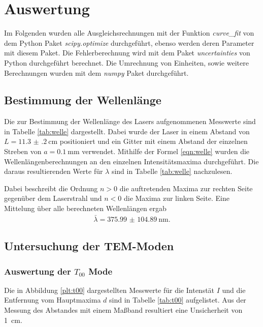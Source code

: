 \newpage
\section{Auswertung}

\label{sec:Auswertung}
Im Folgenden wurden alle Ausgleichsrechnungen mit der Funktion \textit{curve\_fit} von dem
Python Paket \textit{scipy.optimize} \cite{scipy} durchgeführt, ebenso werden deren
Parameter mit diesem Paket. Die Fehlerberechnung wird mit dem Paket \textit{uncertainties}
\cite{uncertainties} von Python durchgeführt berechnet. Die Umrechnung von
Einheiten, sowie weitere Berechnungen wurden mit dem \textit{numpy} Paket \cite{numpy}
durchgeführt.

\subsection{Bestimmung der Wellenlänge}
Die zur Bestimmung der Wellenlänge des Lasers aufgenommenen Messwerte
sind in Tabelle \ref{tab:welle} dargestellt.
Dabei wurde der Laser in einem Abstand
von $L = \SI{11.3(2)}{\centi\meter}$ positioniert und ein Gitter mit einem
Abstand der einzelnen Streben von $a = \SI{0.1}{\milli\meter}$ verwendet.
Mithilfe der Formel \ref{eqn:welle} wurden die Wellenlängenberechnungen an den
einzelnen Intensitätsmaxima durchgeführt. Die daraus resultierenden Werte für
$\lambda$ sind in Tabelle \ref{tab:welle} nachzulesen.



Dabei beschreibt die Ordnung $n>0$ die auftretenden Maxima zur rechten Seite
gegenüber dem Laserstrahl und $n<0$ die Maxima zur linken Seite.
Eine Mittelung über alle berechneten Wellenlängen ergab
\begin{align*}
  \bar{\lambda} = \SI{375.99(10489)}{\nano\meter}.
\end{align*}


\subsection{Untersuchung der TEM-Moden}

\subsubsection{Auswertung der $T_{00}$ Mode}
Die in Abbildung \ref{plt:t00} dargestellten Messwerte für die Intenstät $I$
und die Entfernung vom Hauptmaxima $d$ sind in Tabelle \ref{tab:t00}
aufgelistet. Aus der Messung des Abstandes mit einem Maßband resultiert eine
Unsicherheit von \SI{1}{\centi\meter}.

